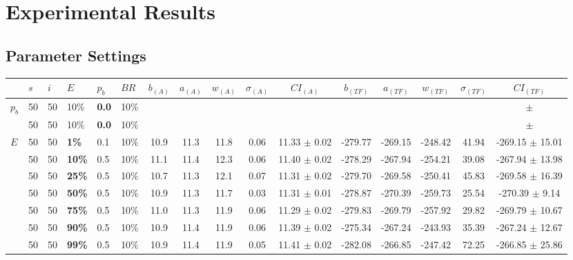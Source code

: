 \chapter{Experimental Results}
\label{appendixC}

\section{Parameter Settings}

\begin{sidewaystable}
    \hspace*{-0.7cm}
    \begin{tabular}{|l|l|l|l|l|l||c|c|c|c|c|c|c|c|c|c|}
    \hline
    ~ & $s$ & $i$ & $E$ & $p_{b}$ & $BR$ & $b_{(A)}$ & $a_{(A)}$ & $w_{(A)}$ & $\sigma_{(A)}$ & $CI_{(A)}$ & $b_{(TF)}$ & $a_{(TF)}$ & $w_{(TF)}$ & $\sigma_{(TF)}$ & $CI_{(TF)}$\\
    \hline
    $p_{b}$ & 50 & 50 & 10\% & \textbf{0.0} & 10\% & ~ & ~ & ~ & ~ & ~ ~ & ~ & ~ & ~ & ~ & ~ $\pm$ ~\\
    ~ & 50 & 50 & 10\% & \textbf{0.0} & 10\% & ~ & ~ & ~ & ~ & ~ ~ & ~ & ~ & ~ & ~ & ~ $\pm$ ~\\
    \hline
    \hline
    $E$ & 50 & 50 & \textbf{1\%} & 0.1 & 10\% & 10.9 & 11.3 & 11.8 & 0.06 & 11.33 $\pm$ 0.02 & -279.77 & -269.15 & -248.42 & 41.94 & -269.15 $\pm$ 15.01 \\
    ~ & 50 & 50 & \textbf{10\%} & 0.5 & 10\% & 11.1 & 11.4 & 12.3 & 0.06 & 11.40 $\pm$ 0.02 & -278.29 & -267.94 & -254.21 & 39.08 & -267.94 $\pm$ 13.98 \\
    ~ & 50 & 50 & \textbf{25\%} & 0.5 & 10\% & 10.7 & 11.3 & 12.1 & 0.07 & 11.31 $\pm$ 0.02 & -279.70 & -269.58 & -250.41 & 45.83 & -269.58 $\pm$ 16.39 \\
    ~ & 50 & 50 & \textbf{50\%} & 0.5 & 10\% & 10.9 & 11.3 & 11.7 & 0.03 & 11.31 $\pm$ 0.01 & -278.87 & -270.39 & -259.73 & 25.54 & -270.39 $\pm$ 9.14 \\
    ~ & 50 & 50 & \textbf{75\%} & 0.5 & 10\% & 11.0 & 11.3 & 11.9 & 0.06 & 11.29 $\pm$ 0.02 & -279.83 & -269.79 & -257.92 & 29.82 & -269.79 $\pm$ 10.67 \\
    ~ & 50 & 50 & \textbf{90\%} & 0.5 & 10\% & 10.9 & 11.4 & 11.9 & 0.06 & 11.39 $\pm$ 0.02 & -275.34 & -267.24 & -243.93 & 35.39 & -267.24 $\pm$ 12.67 \\
    ~ & 50 & 50 & \textbf{99\%} & 0.5 & 10\% & 10.9 & 11.4 & 11.9 & 0.05 & 11.41 $\pm$ 0.02 & -282.08 & -266.85 & -247.42 & 72.25 & -266.85 $\pm$ 25.86 \\

\end{tabular}
\end{sidewaystable}
